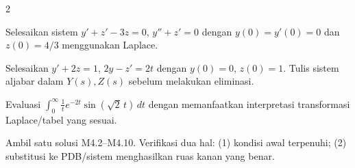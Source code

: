 \documentclass[10pt,a4paper]{article}
\newcommand{\level}[1]{\colorbox{levelbg}{\scriptsize\strut #1}}
\newcommand{\src}[1]{\colorbox{sourcebg}{\scriptsize\strut #1}}
\begin{document}
\begin{multicols}{2}
\begin{qbox}[title={M4.9: Sistem PDB I\hfill \level{L4}\;\src{PR}}]
\small Selesaikan sistem $y'+z'-3z=0$, $y''+z'=0$ dengan $y(0)=y'(0)=0$ dan $z(0)=4/3$ menggunakan Laplace.
\end{qbox}
\begin{qbox}[title={M4.10: Sistem PDB II\hfill \level{L4}\;\src{PR}}]
\small Selesaikan $y'+2z=1$, $2y-z'=2t$ dengan $y(0)=0$, $z(0)=1$. Tulis sistem aljabar dalam $Y(s),Z(s)$ sebelum melakukan eliminasi.
\end{qbox}
\begin{qbox}[title={M4.11: Integral tak wajar via tabel Laplace\hfill \level{L3}\;\src{PR}}]
\small Evaluasi $\displaystyle \int_0^\infty \frac{1}{t}e^{-2t}\sin(\sqrt2\,t)\,dt$ dengan memanfaatkan interpretasi transformasi Laplace/tabel yang sesuai.
\end{qbox}
\begin{qbox}[title={M4.12: Cek solusi\hfill \level{L2}\;\src{Var}}]
\small Ambil satu solusi M4.2--M4.10. Verifikasi dua hal: (1) kondisi awal terpenuhi; (2) substitusi ke PDB/sistem menghasilkan ruas kanan yang benar.
\end{qbox}
\end{multicols}
\newpage
\end{document}
